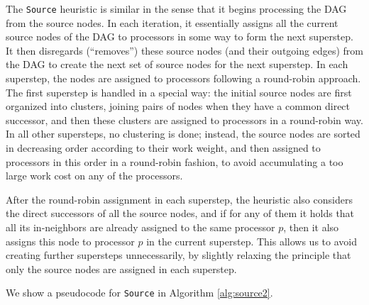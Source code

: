 \documentclass[sigconf,nonacm]{acmart}
\begin{document}
The \texttt{Source} heuristic is similar in the sense that it begins processing the DAG from the source nodes. In each iteration, it essentially assigns all the current source nodes of the DAG to processors in some way to form the next superstep. It then disregards (``removes'') these source nodes (and their outgoing edges) from the DAG to create the next set of source nodes for the next superstep. In each superstep, the nodes are assigned to processors following a round-robin approach. The first superstep is handled in a special way: the initial source nodes are first organized into clusters, joining pairs of nodes when they have a common direct successor, and then these clusters are assigned to processors in a round-robin way. In all other supersteps, no clustering is done; instead, the source nodes are sorted in decreasing order according to their work weight, and then assigned to processors in this order in a round-robin fashion, to avoid accumulating a too large work cost on any of the processors.

After the round-robin assignment in each superstep, the heuristic also considers the direct successors of all the source nodes, and if for any of them it holds that all its in-neighbors are already assigned to the same processor $p$, then it also assigns this node to processor $p$ in the current superstep. This allows us to avoid creating further supersteps unnecessarily, by slightly relaxing the principle that only the source nodes are assigned in each superstep.

We show a pseudocode for \texttt{Source} in Algorithm \ref{alg:source2}.
\end{document}
